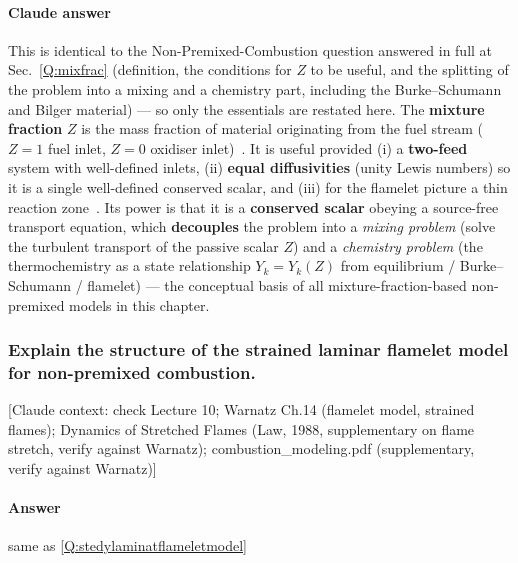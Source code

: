 {\color{istblue}
\paragraph{Claude answer}
This is identical to the Non-Premixed-Combustion question answered in full at Sec.~\ref{Q:mixfrac} (definition, the conditions for $Z$ to be useful, and the splitting of the problem into a mixing and a chemistry part, including the Burke--Schumann and Bilger material) --- so only the essentials are restated here. The \textbf{mixture fraction} $Z$ is the mass fraction of material originating from the fuel stream ($Z=1$ fuel inlet, $Z=0$ oxidiser inlet)~\cite{lecture9,warnatz2006combustion}. It is useful provided (i) a \textbf{two-feed} system with well-defined inlets, (ii) \textbf{equal diffusivities} (unity Lewis numbers) so it is a single well-defined conserved scalar, and (iii) for the flamelet picture a thin reaction zone~\cite{lecture9,poinsot2012theoretical}. Its power is that it is a \textbf{conserved scalar} obeying a source-free transport equation, which \textbf{decouples} the problem into a \emph{mixing problem} (solve the turbulent transport of the passive scalar $Z$) and a \emph{chemistry problem} (the thermochemistry as a state relationship $Y_k=Y_k(Z)$ from equilibrium / Burke--Schumann / flamelet) --- the conceptual basis of all mixture-fraction-based non-premixed models in this chapter.
}




\subsubsection{Explain the structure of the strained laminar flamelet model for non-premixed combustion.}

{\color{gray}\footnotesize [Claude context: check Lecture 10; Warnatz Ch.14 (flamelet model, strained flames); Dynamics of Stretched Flames (Law, 1988, supplementary on flame stretch, verify against Warnatz); combustion\_modeling.pdf (supplementary, verify against Warnatz)]}

\paragraph{Answer} same as \ref{Q:stedylaminatflameletmodel}

